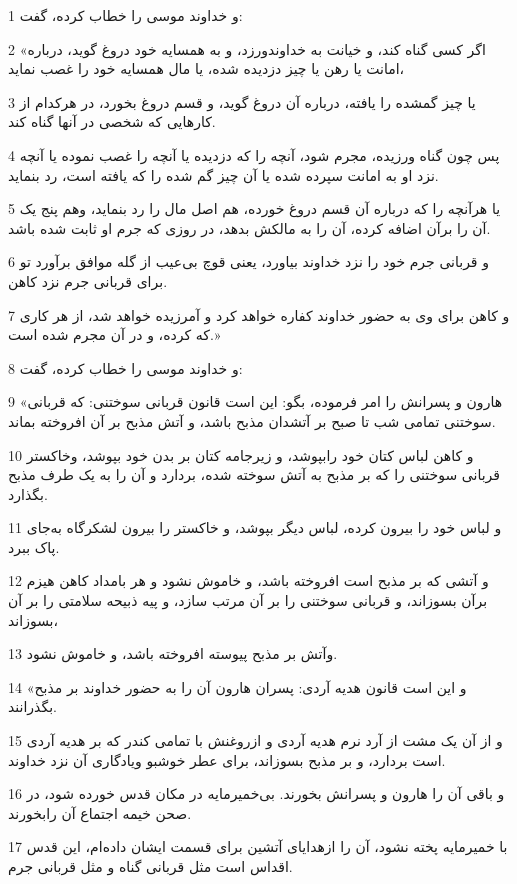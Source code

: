 \par 1 و خداوند موسی را خطاب کرده، گفت:
\par 2 «اگر کسی گناه کند، و خیانت به خداوندورزد، و به همسایه خود دروغ گوید، درباره امانت یا رهن یا چیز دزدیده شده، یا مال همسایه خود را غصب نماید،
\par 3 یا چیز گمشده را یافته، درباره آن دروغ گوید، و قسم دروغ بخورد، در هرکدام از کارهایی که شخصی در آنها گناه کند.
\par 4 پس چون گناه ورزیده، مجرم شود، آنچه را که دزدیده یا آنچه را غصب نموده یا آنچه نزد او به امانت سپرده شده یا آن چیز گم شده را که یافته است، رد بنماید.
\par 5 یا هر‌آنچه را که درباره آن قسم دروغ خورده، هم اصل مال را رد بنماید، وهم پنج یک آن را برآن اضافه کرده، آن را به مالکش بدهد، در روزی که جرم او ثابت شده باشد.
\par 6 و قربانی جرم خود را نزد خداوند بیاورد، یعنی قوچ بی‌عیب از گله موافق برآورد تو برای قربانی جرم نزد کاهن.
\par 7 و کاهن برای وی به حضور خداوند کفاره خواهد کرد و آمرزیده خواهد شد، از هر کاری که کرده، و در آن مجرم شده است.»
\par 8 و خداوند موسی را خطاب کرده، گفت:
\par 9 «هارون و پسرانش را امر فرموده، بگو: این است قانون قربانی سوختنی: که قربانی سوختنی تمامی شب تا صبح بر آتشدان مذبح باشد، و آتش مذبح بر آن افروخته بماند.
\par 10 و کاهن لباس کتان خود رابپوشد، و زیرجامه کتان بر بدن خود بپوشد، وخاکستر قربانی سوختنی را که بر مذبح به آتش سوخته شده، بردارد و آن را به یک طرف مذبح بگذارد.
\par 11 و لباس خود را بیرون کرده، لباس دیگر بپوشد، و خاکستر را بیرون لشکرگاه به‌جای پاک ببرد.
\par 12 و آتشی که بر مذبح است افروخته باشد، و خاموش نشود و هر بامداد کاهن هیزم برآن بسوزاند، و قربانی سوختنی را بر آن مرتب سازد، و پیه ذبیحه سلامتی را بر آن بسوزاند،
\par 13 وآتش بر مذبح پیوسته افروخته باشد، و خاموش نشود.
\par 14 «و این است قانون هدیه آردی: پسران هارون آن را به حضور خداوند بر مذبح بگذرانند.
\par 15 و از آن یک مشت از آرد نرم هدیه آردی و ازروغنش با تمامی کندر که بر هدیه آردی است بردارد، و بر مذبح بسوزاند، برای عطر خوشبو ویادگاری آن نزد خداوند.
\par 16 و باقی آن را هارون و پسرانش بخورند. بی‌خمیرمایه در مکان قدس خورده شود، در صحن خیمه اجتماع آن رابخورند.
\par 17 با خمیرمایه پخته نشود، آن را ازهدایای آتشین برای قسمت ایشان داده‌ام، این قدس اقداس است مثل قربانی گناه و مثل قربانی جرم.
